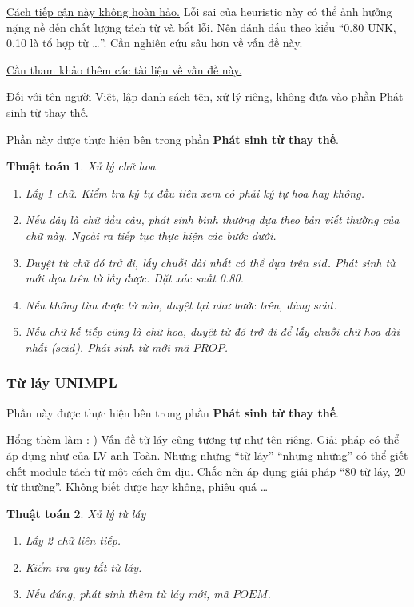 \documentclass[a4paper,oneside]{book} %
\newcommand{\note}[1]{\underline{#1}}
\newtheorem{algo}{Thuật toán}
\begin{document}
\note{Cách tiếp cận này không hoàn hảo.} Lỗi sai của heuristic này
có thể ảnh hưởng nặng nề đến chất lượng tách từ và bắt lỗi. Nên đánh
dấu theo kiểu ``0.80 UNK, 0.10 là tổ hợp từ \ldots''. Cần
nghiên cứu sâu hơn về vấn đề này.

\note{Cần tham khảo thêm các tài liệu về vấn đề này.}

Đối với tên người Việt, lập danh sách tên, xử lý riêng, không đưa vào
phần Phát sinh từ thay thế.

Phần này được thực hiện bên trong phần \textbf{Phát sinh từ thay thế}.

\begin{algo} Xử lý chữ hoa

\label{algo:propername}
  \begin{enumerate}
  \item Lấy 1 chữ. Kiểm tra ký tự đầu tiên xem có phải ký tự hoa hay
    không.
  \item Nếu đây là chữ đầu câu, phát sinh bình thường dựa theo bản
    viết thường của chữ này. Ngoài ra tiếp tục thực hiện các bước
    dưới.
  \item Duyệt từ chữ đó trở đi, lấy chuỗi dài nhất có thể dựa trên
    $sid$. Phát sinh từ mới dựa trên từ lấy được. Đặt xác suất 0.80.
  \item Nếu không tìm được từ nào, duyệt lại như bước trên, dùng
    $scid$.
  \item Nếu chữ kế tiếp cũng là chữ hoa, duyệt từ đó trở đi để lấy
    chuỗi chữ hoa dài nhất ($scid$). Phát sinh từ mới
    mã $PROP$. 
  \end{enumerate}
\end{algo}

\subsubsection{Từ láy UNIMPL}

Phần này được thực hiện bên trong phần \textbf{Phát sinh từ thay thế}.

\note{Hổng thèm làm :-)} Vấn đề từ láy cũng tương tự như  tên riêng. Giải
pháp có thể áp dụng như của LV anh Toàn. Nhưng những ``từ láy''
``nhưng những'' có thể giết chết module tách từ một cách êm dịu. Chắc
nên áp dụng giải pháp ``80 từ láy, 20 từ thường''. Không biết được hay
không, phiêu quá \ldots

\begin{algo} Xử lý từ láy

\label{algo:poem}
  \begin{enumerate}
  \item Lấy 2 chữ liên tiếp.
  \item Kiểm tra quy tắt từ láy.
  \item Nếu đúng, phát sinh thêm từ láy mới, mã $POEM$.
  \end{enumerate}
\end{algo}
\end{document}
